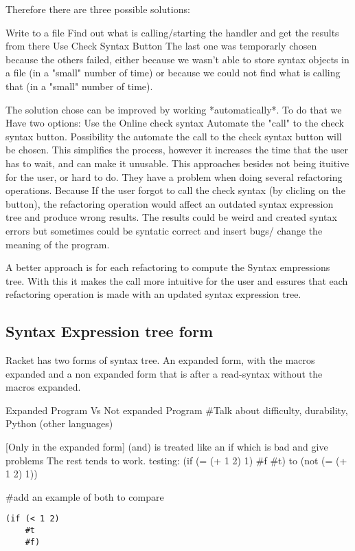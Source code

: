 Therefore there are three possible solutions:

Write to a file
Find out what is calling/starting the handler and get the results from there
Use Check Syntax Button
The last one was temporarly chosen because the others failed, either because we wasn't able
 to store syntax objects in a file (in a "small" number of time) or because we
 could not find what is calling that (in a "small" number of time).

The solution chose can be improved by working *automatically*.
To do that we Have two options:
 Use the Online check syntax
 Automate the "call" to the check syntax button.
 Possibility the automate the call to the check syntax button will be chosen.
 This simplifies the process, however it increases the time that the user has to
 wait, and can make it unusable.
This approaches besides not being ituitive for the user, or hard to do. They have
a problem when doing several refactoring operations. Because If the user forgot
to call the check syntax (by clicling on the button), the refactoring operation
would affect an outdated syntax expression tree and produce wrong results. The
results could be weird and created syntax errors but sometimes could be syntatic
correct and insert bugs/ change the meaning of the program.

A better approach is for each refactoring to compute the Syntax empressions tree.
With this it makes the call more intuitive for the user and essures that each
refactoring operation is made with an updated syntax expression tree.

\subsection{Syntax Expression tree form}
Racket has two forms of syntax tree. An expanded form, with the macros expanded
and a non expanded form that is after a read-syntax without the macros expanded.

Expanded Program Vs Not expanded Program
\#Talk about difficulty, durability, Python (other languages)

[Only in the expanded form] (and) is treated like an if which is bad and give problems
The rest tends to work.
testing:
(if (= (+ 1 2) 1) \#f \#t) to (not (= (+ 1 2) 1))

\#add an example of both to compare
\begin{lstlisting}[caption="example"]
(if (< 1 2)
    #t
    #f)
\end{lstlisting}

